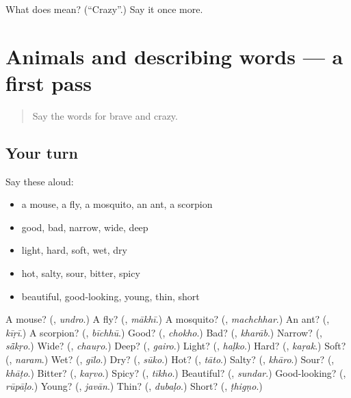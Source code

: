 \begin{tcolorbox}[breakable,colback=teal!4,colframe=teal!35!black,title={Before you move on}]
What does  mean? (\textquotedblleft{}Crazy\textquotedblright{}.) Say it once more.
\end{tcolorbox}
\section[(dialogue)]{Animals and describing words — a first pass}

\label{lesson:MW-R149-first-pass-animals-and-describing-words}



\begin{quote}
Say the words for brave and crazy.
\end{quote}

\subsection*{Your turn}
Say these aloud:

\begin{itemize}
\raggedright
  \item a mouse, a fly, a mosquito, an ant, a scorpion
  \item good, bad, narrow, wide, deep
  \item light, hard, soft, wet, dry
  \item hot, salty, sour, bitter, spicy
  \item beautiful, good-looking, young, thin, short
\end{itemize}

\begin{tcolorbox}[breakable,colback=teal!4,colframe=teal!35!black,title={Before you move on}]
A mouse? (\textbf{}, \emph{undro}.) A fly? (\textbf{}, \emph{mākhī}.) A mosquito? (\textbf{}, \emph{machchhar}.) An ant? (\textbf{}, \emph{kīṛī}.) A scorpion? (\textbf{}, \emph{bīchhū}.) Good? (\textbf{}, \emph{chokho}.) Bad? (\textbf{}, \emph{kharāb}.) Narrow? (\textbf{}, \emph{sā̃kṛo}.) Wide? (\textbf{}, \emph{chauṛo}.) Deep? (\textbf{}, \emph{gairo}.) Light? (\textbf{}, \emph{haḷko}.) Hard? (\textbf{}, \emph{kaṛak}.) Soft? (\textbf{}, \emph{naram}.) Wet? (\textbf{}, \emph{gīlo}.) Dry? (\textbf{}, \emph{sūko}.) Hot? (\textbf{}, \emph{tāto}.) Salty? (\textbf{}, \emph{khāro}.) Sour? (\textbf{}, \emph{khāṭo}.) Bitter? (\textbf{}, \emph{kaṛvo}.) Spicy? (\textbf{}, \emph{tīkho}.) Beautiful? (\textbf{}, \emph{sundar}.) Good-looking? (\textbf{}, \emph{rūpāḷo}.) Young? (\textbf{}, \emph{javān}.) Thin? (\textbf{}, \emph{dubaḷo}.) Short? (\textbf{}, \emph{ṭhigṇo}.)
\end{tcolorbox}
